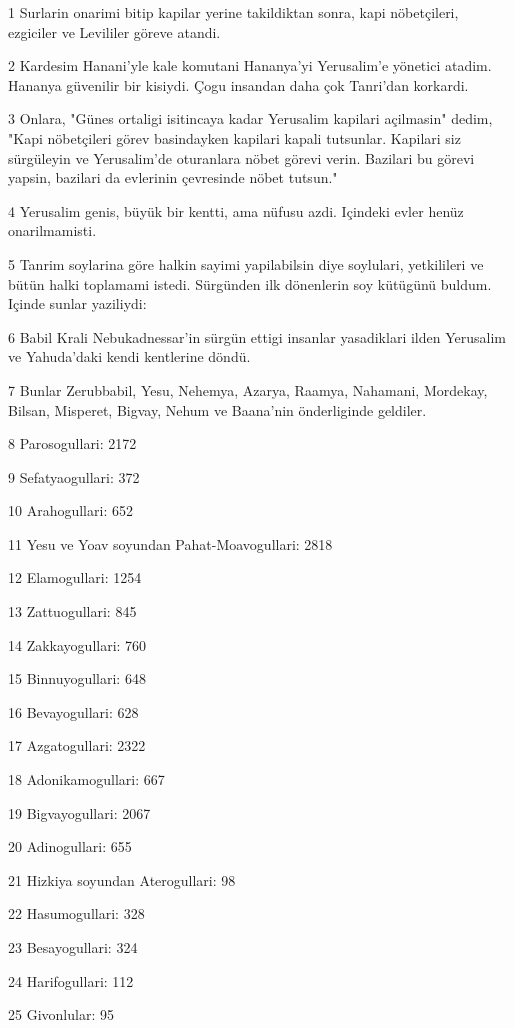 \par 1 Surlarin onarimi bitip kapilar yerine takildiktan sonra, kapi nöbetçileri, ezgiciler ve Levililer göreve atandi.
\par 2 Kardesim Hanani'yle kale komutani Hananya'yi Yerusalim'e yönetici atadim. Hananya güvenilir bir kisiydi. Çogu insandan daha çok Tanri'dan korkardi.
\par 3 Onlara, "Günes ortaligi isitincaya kadar Yerusalim kapilari açilmasin" dedim, "Kapi nöbetçileri görev basindayken kapilari kapali tutsunlar. Kapilari siz sürgüleyin ve Yerusalim'de oturanlara nöbet görevi verin. Bazilari bu görevi yapsin, bazilari da evlerinin çevresinde nöbet tutsun."
\par 4 Yerusalim genis, büyük bir kentti, ama nüfusu azdi. Içindeki evler henüz onarilmamisti.
\par 5 Tanrim soylarina göre halkin sayimi yapilabilsin diye soylulari, yetkilileri ve bütün halki toplamami istedi. Sürgünden ilk dönenlerin soy kütügünü buldum. Içinde sunlar yaziliydi:
\par 6 Babil Krali Nebukadnessar'in sürgün ettigi insanlar yasadiklari ilden Yerusalim ve Yahuda'daki kendi kentlerine döndü.
\par 7 Bunlar Zerubbabil, Yesu, Nehemya, Azarya, Raamya, Nahamani, Mordekay, Bilsan, Misperet, Bigvay, Nehum ve Baana'nin önderliginde geldiler.
\par 8 Parosogullari: 2172
\par 9 Sefatyaogullari: 372
\par 10 Arahogullari: 652
\par 11 Yesu ve Yoav soyundan Pahat-Moavogullari: 2818
\par 12 Elamogullari: 1254
\par 13 Zattuogullari: 845
\par 14 Zakkayogullari: 760
\par 15 Binnuyogullari: 648
\par 16 Bevayogullari: 628
\par 17 Azgatogullari: 2322
\par 18 Adonikamogullari: 667
\par 19 Bigvayogullari: 2067
\par 20 Adinogullari: 655
\par 21 Hizkiya soyundan Aterogullari: 98
\par 22 Hasumogullari: 328
\par 23 Besayogullari: 324
\par 24 Harifogullari: 112
\par 25 Givonlular: 95
